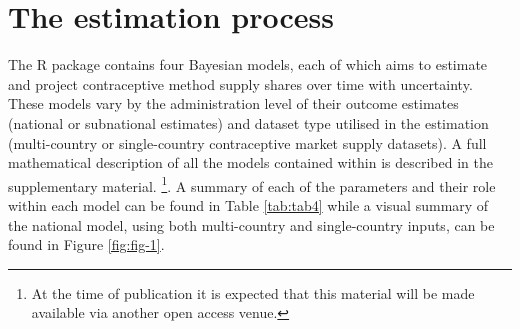 \begin{table}[h]
\caption{The arguments of the get\_modelinputs function. The purpose of this function is to get the model inputs for the JAGS model used for supply share estimation. In the table, the argument name and data type of the argument is stated, a description of the argument and any default values is then provided.}
\label{tab:tab2}
\end{table}

\hypertarget{the-estimation-process}{%
\section{The estimation process}\label{the-estimation-process}}

The  R package contains four Bayesian models, each of which aims to estimate and project contraceptive method supply shares over time with uncertainty. These models vary by the administration level of their outcome estimates (national or subnational estimates) and dataset type utilised in the estimation (multi-country or single-country contraceptive market supply datasets). A full mathematical description of all the models contained within  is described in the supplementary material. \footnote{At the time of publication it is expected that this material will be made available via another open access venue.}. A summary of each of the parameters and their role within each model can be found in Table \ref{tab:tab4} while a visual summary of the national model, using both multi-country and single-country inputs, can be found in Figure \ref{fig:fig-1}.

